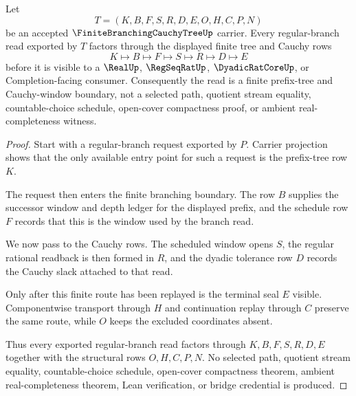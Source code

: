 \begin{theorem}
\label{thm:finite-branching-cauchy-tree-regular-branch-boundary}
Let
$$
T=(K,B,F,S,R,D,E,O,H,C,P,N)
$$
be an accepted $\FiniteBranchingCauchyTreeUp$ carrier. Every regular-branch read exported by $T$ factors through the displayed finite tree and Cauchy rows
$$
K\longmapsto B\longmapsto F\longmapsto S\longmapsto R\longmapsto D\longmapsto E
$$
before it is visible to a $\RealUp$, $\RegSeqRatUp$, $\DyadicRatCoreUp$, or Completion-facing consumer. Consequently the read is a finite prefix-tree and Cauchy-window boundary, not a selected path, quotient stream equality, countable-choice schedule, open-cover compactness proof, or ambient real-completeness witness.
\end{theorem}
\begin{proof}
Start with a regular-branch request exported by $P$. Carrier projection shows that the only available entry point for such a request is the prefix-tree row $K$.

The request then enters the finite branching boundary. The row $B$ supplies the successor window and depth ledger for the displayed prefix, and the schedule row $F$ records that this is the window used by the branch read.

We now pass to the Cauchy rows. The scheduled window opens $S$, the regular rational readback is then formed in $R$, and the dyadic tolerance row $D$ records the Cauchy slack attached to that read.

Only after this finite route has been replayed is the terminal seal $E$ visible. Componentwise transport through $H$ and continuation replay through $C$ preserve the same route, while $O$ keeps the excluded coordinates absent.

Thus every exported regular-branch read factors through $K,B,F,S,R,D,E$ together with the structural rows $O,H,C,P,N$. No selected path, quotient stream equality, countable-choice schedule, open-cover compactness theorem, ambient real-completeness theorem, Lean verification, or bridge credential is produced.
\end{proof}



